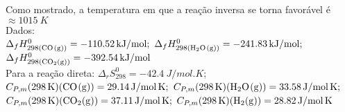  Como mostrado, a temperatura em que a reação inversa se torna favorável é
 $\approx \qty{1015}{K}$ \\
 
\noindent Dados:\\
\( \Delta_f H^0_{298(\ce{CO(g)})} = \qty{-110.52}{kJ \per mol};\) 
\( \Delta_f H^0_{298(\ce{H2O(g)})} = \qty{-241.83}{kJ \per mol};\) 
\( \Delta_f H^0_{298(\ce{CO2(g)})} = \qty{-392.54}{kJ \per mol}\) \\
Para a reação direta: \( \Delta _r S^0_{298} = \qty{-42.4}{J \per mol . K} \);\\
\(C_{P,m} (\qty{298}{K}) (\ce{CO(g)}) = \qty{29.14}{J \per mol . K}; \)
\(C_{P,m} (\qty{298}{K}) (\ce{H2O(g)}) = \qty{33.58}{J \per mol . K}; \)\\
\(C_{P,m} (\qty{298}{K}) (\ce{CO2(g)}) = \qty{37.11}{J \per mol . K}; \)
\(C_{P,m} (\qty{298}{K}) (\ce{H2(g)}) = \qty{28.82}{J \per mol . K} \)

